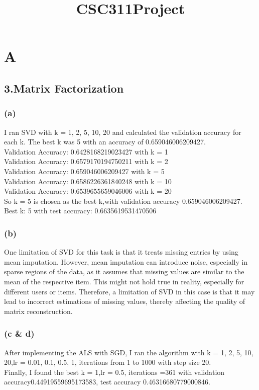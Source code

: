\documentclass{article}
\title{CSC311Project}
\begin{document}
\maketitle



\section*{A}
\subsection*{3.Matrix Factorization}
\subsubsection*{(a)}
I ran SVD with k = 1, 2, 5, 10, 20 and calculated the validation accuracy for each k. The best k was 5 with an accuracy of 0.659046006209427.\\
Validation Accuracy: 0.6428168219023427 with k = 1\\
Validation Accuracy: 0.6579170194750211 with k = 2\\
Validation Accuracy: 0.659046006209427 with k = 5\\
Validation Accuracy: 0.6586226361840248 with k = 10\\
Validation Accuracy: 0.6539655659046006 with k = 20\\
So k = 5 is chosen as the best k,with validation accuracy 0.659046006209427.\\
Best k: 5 with test accuracy: 0.6635619531470506\\

\subsubsection*{(b)}
One limitation of SVD for this task is that it treats missing entries by using mean imputation. However,
mean imputation can introduce noise, especially in sparse regions of the data, as it assumes that missing values are similar
to the mean of the respective item. This might not hold true in reality, especially for different users or items. Therefore,
a limitation of SVD in this case is that it may lead to incorrect estimations of missing values, thereby affecting the quality
of matrix reconstruction.


\subsubsection*{(c & d)}
After implementing the ALS with SGD, I ran the algorithm with k = 1, 2, 5, 10, 20,lr = 0.01, 0.1, 0.5, 1, iterations from 1 to 1000 with step size 20.\\
Finally, I found the best k = 1,lr = 0.5, iterations =361 with validation accuracy0.44919559695173583, test accuracy 0.46316680779000846.\\
\end{document}
